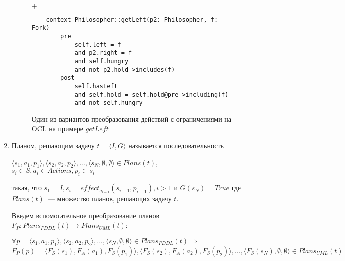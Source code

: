 \begin{enumerate}
\begin{figure}[h]
    \begin{minipage}[h]{1\linewidth}
    \end{minipage} \\
    \vfill
    {\centering $+$ \\ \medskip } 
        \begin{minipage}[h]{0.43\linewidth}
           \footnotesize
           \begin{verbatim}
    context Philosopher::getLeft(p2: Philosopher, f: Fork)
        pre 
            self.left = f 
            and p2.right = f 
            and self.hungry 
            and not p2.hold->includes(f)
        post
            self.hasLeft
            and self.hold = self.hold@pre->including(f)
            and not self.hungry
           \end{verbatim}
        \end{minipage}

    \begin{center}
        \begin{minipage}{0.8\linewidth}
            \caption{Один из вариантов преобразования действий с ограничениями на OCL на примере $getLeft$ }
        \end{minipage}    
    \end{center}

    \label{img:property-actions}
\end{figure}      

    \item
        Планом, решающим задачу $t = \langle I, G \rangle$ называется последовательность 
        \begin{center}
            $\langle s_1, a_1, p_1  \rangle, \langle s_2, a_2, p_2  \rangle, ..., \langle s_N, \emptyset, \emptyset \rangle \in Plans(t)$, \\ $s_i \in S, a_i \in Actions, p_i \subset s_i$
        \end{center}
        такая, что $s_1 = I, s_i = effect_{a_{i-1}}(s_{i-1}, p_{i-1}), i > 1$ и $G(s_N) = True$ где $Plans(t)$~--- множество планов, решающих задачу $t$.
            
        Введем вспомогательное преобразование планов $F_P: Plans_{PDDL}(t) \rightarrow Plans_{UML}(t)$:
            \begin{center}
                $\forall p = \langle s_1, a_1, p_1  \rangle, \langle s_2, a_2, p_2  \rangle, ..., \langle s_N, \emptyset, \emptyset  \rangle \in Plans_{PDDL}(t) \Rightarrow $\\
            $F_P(p) = \langle F_S(s_1), F_A(a_1), F_S(p_1)  \rangle, \langle F_S(s_2), F_A(a_2), F_S(p_2)  \rangle, ..., \langle F_S(s_N), \emptyset, \emptyset  \rangle \in Plans_{UML}(t) $  
            \end{center}
            

\end{enumerate}
